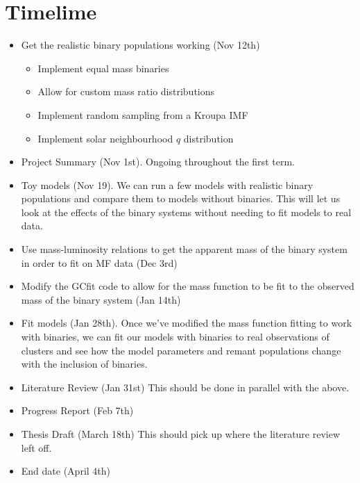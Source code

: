 \documentclass[12pt,letterpaper]{article}
\begin{document}
\section{Timelime}
\begin{itemize}
\item Get the realistic binary populations working (Nov 12th)
	      \begin{itemize}
\item Implement equal mass binaries \checkmark
\item Allow for custom mass ratio distributions
\item Implement random sampling from a Kroupa IMF
\item Implement solar neighbourhood $q$ distribution
	      \end{itemize}
\item Project Summary (Nov 1st). Ongoing throughout the first term.
\item Toy models (Nov 19). We can run a few models with realistic binary populations and
compare them to models without binaries. This will let us look at the effects of the binary
systems without needing to fit models to real data.
	\item Use mass-luminosity relations to get the apparent mass of the binary system in order
to fit on MF data (Dec 3rd)
	\item Modify the GCfit code to allow for the mass function to be fit to the observed mass of
the binary system (Jan 14th)
\item Fit models (Jan 28th). Once we've modified the mass function fitting to work with
binaries, we can fit our models with binaries to real observations of clusters and see how
the model parameters and remant populations change with the inclusion of binaries.
\item Literature Review (Jan 31st) This should be done in parallel with the above.
	\item Progress Report (Feb 7th)
\item Thesis Draft (March 18th) This should pick up where the literature review left off.
	\item End date (April 4th)
\end{itemize}
\end{document}
